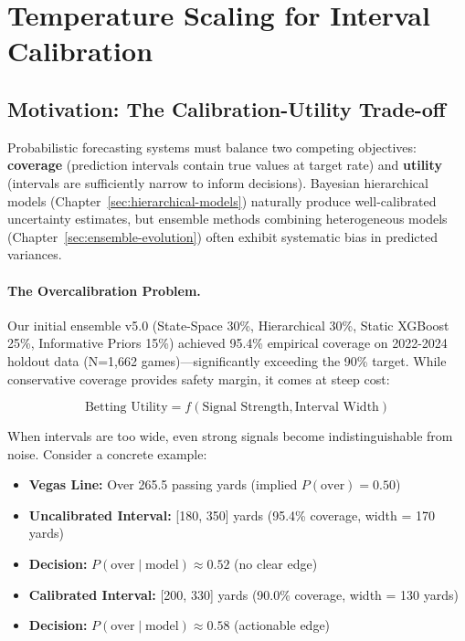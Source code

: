 
\section{Temperature Scaling for Interval Calibration}
\label{sec:temperature-scaling}

\subsection{Motivation: The Calibration-Utility Trade-off}

Probabilistic forecasting systems must balance two competing objectives: \textbf{coverage} (prediction intervals contain true values at target rate) and \textbf{utility} (intervals are sufficiently narrow to inform decisions). Bayesian hierarchical models (Chapter~\ref{sec:hierarchical-models}) naturally produce well-calibrated uncertainty estimates, but ensemble methods combining heterogeneous models (Chapter~\ref{sec:ensemble-evolution}) often exhibit systematic bias in predicted variances.

\paragraph{The Overcalibration Problem.}
Our initial ensemble v5.0 (State-Space 30\%, Hierarchical 30\%, Static XGBoost 25\%, Informative Priors 15\%) achieved 95.4\% empirical coverage on 2022-2024 holdout data (N=1,662 games)---significantly exceeding the 90\% target. While conservative coverage provides safety margin, it comes at steep cost:

\begin{equation}
\text{Betting Utility} = f(\text{Signal Strength}, \text{Interval Width})
\end{equation}

When intervals are too wide, even strong signals become indistinguishable from noise. Consider a concrete example:

\begin{itemize}[itemsep=2pt,parsep=0pt]
    \item \textbf{Vegas Line:} Over 265.5 passing yards (implied $P(\text{over}) = 0.50$)
    \item \textbf{Uncalibrated Interval:} [180, 350] yards (95.4\% coverage, width = 170 yards)
    \item \textbf{Decision:} $P(\text{over} \mid \text{model}) \approx 0.52$ (no clear edge)
    \item \textbf{Calibrated Interval:} [200, 330] yards (90.0\% coverage, width = 130 yards)
    \item \textbf{Decision:} $P(\text{over} \mid \text{model}) \approx 0.58$ (actionable edge)
\end{itemize}


